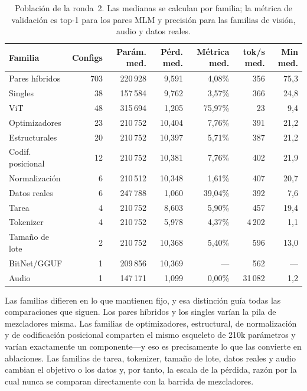 \begin{table}[H]
\centering
\small
\caption{Población de la ronda~2. Las medianas se calculan por familia; la métrica de validación es top-1 para los pares MLM y precisión para las familias de visión, audio y datos reales.}
\label{tab:round2-families}
\begin{tabular}{lrrrrrr}
\toprule
Familia & Configs & Parám. med. & Pérd. med. & Métrica med. & tok/s med. & Min med. \\
\midrule
Pares híbridos     & 703 & 220\,928 & 9,591 & 4,08\%  & 356 & 75,3 \\
Singles            & 38  & 157\,584 & 9,762 & 3,57\%  & 366 & 24,8 \\
ViT                & 48  & 315\,694 & 1,205 & 75,97\% & 23  & 9,4  \\
Optimizadores      & 23  & 210\,752 & 10,404 & 7,76\% & 391 & 21,2 \\
Estructurales     & 20  & 210\,752 & 10,397 & 5,71\% & 387 & 21,2 \\
Codif. posicional  & 12  & 210\,752 & 10,381 & 7,76\% & 402 & 21,9 \\
Normalización      & 6   & 210\,512 & 10,348 & 1,61\% & 407 & 20,7 \\
Datos reales       & 6   & 247\,788 & 1,060 & 39,04\% & 392 & 7,6  \\
Tarea              & 4   & 210\,752 & 8,603 & 5,90\% & 457 & 19,4 \\
Tokenizer          & 4   & 210\,752 & 5,978 & 4,37\% & 4\,202 & 1,1 \\
Tamaño de lote     & 2   & 210\,752 & 10,368 & 5,40\% & 596 & 13,0 \\
BitNet/GGUF        & 1   & 209\,856 & 10,369 & ---    & 562 & ---  \\
Audio              & 1   & 147\,171 & 1,099 & 0,00\%  & 31\,082 & 1,2 \\
\bottomrule
\end{tabular}
\end{table}

Las familias difieren en lo que mantienen fijo, y esa distinción guía todas las comparaciones que siguen. Los pares híbridos y los singles varían la pila de mezcladores misma. Las familias de optimizadores, estructural, de normalización y de codificación posicional comparten el mismo esqueleto de 210k parámetros y varían exactamente un componente---y eso es precisamente lo que las convierte en ablaciones. Las familias de tarea, tokenizer, tamaño de lote, datos reales y audio cambian el objetivo o los datos y, por tanto, la escala de la pérdida, razón por la cual nunca se comparan directamente con la barrida de mezcladores.


